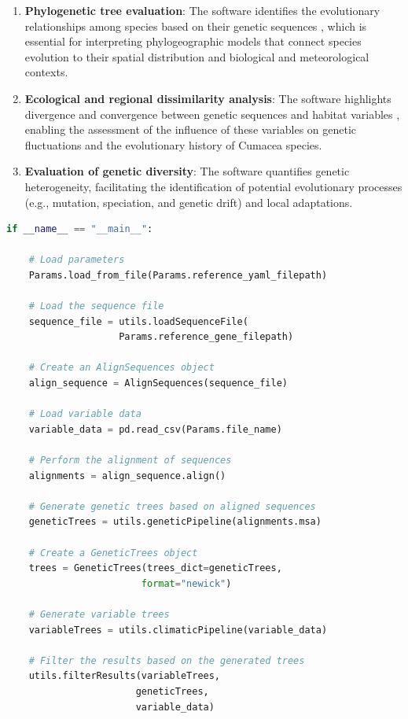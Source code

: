 \begin{enumerate}[label=\arabic*.]
\item \textbf{Phylogenetic tree evaluation}: The software identifies the evolutionary relationships among species based on their genetic sequences \citep{li2024host, li2023aphylogeo, koshkarov_phylogeography_2022}, which is essential for interpreting phylogeographic models that connect species evolution to their spatial distribution and biological and meteorological contexts.

\item \textbf{Ecological and regional dissimilarity analysis}: The software highlights divergence and convergence between genetic sequences and habitat variables \citep{li2024host, li2023aphylogeo, koshkarov_phylogeography_2022}, enabling the assessment of the influence of these variables on genetic fluctuations and the evolutionary history of Cumacea species.

\item \textbf{Evaluation of genetic diversity}: The software quantifies genetic heterogeneity, facilitating the identification of potential evolutionary processes (e.g., mutation, speciation, and genetic drift) and local adaptations.
\end{enumerate}

\begin{lstlisting}[label=lst:main,language=Python,caption=Main script for tutorial using the aPhyloGeo package.]
if __name__ == "__main__":

    # Load parameters
    Params.load_from_file(Params.reference_yaml_filepath)

    # Load the sequence file
    sequence_file = utils.loadSequenceFile(
                    Params.reference_gene_filepath)

    # Create an AlignSequences object
    align_sequence = AlignSequences(sequence_file)

    # Load variable data
    variable_data = pd.read_csv(Params.file_name)

    # Perform the alignment of sequences
    alignments = align_sequence.align()

    # Generate genetic trees based on aligned sequences
    geneticTrees = utils.geneticPipeline(alignments.msa)

    # Create a GeneticTrees object
    trees = GeneticTrees(trees_dict=geneticTrees,
                        format="newick")

    # Generate variable trees
    variableTrees = utils.climaticPipeline(variable_data)

    # Filter the results based on the generated trees
    utils.filterResults(variableTrees,
                       geneticTrees,
                       variable_data)
\end{lstlisting}

